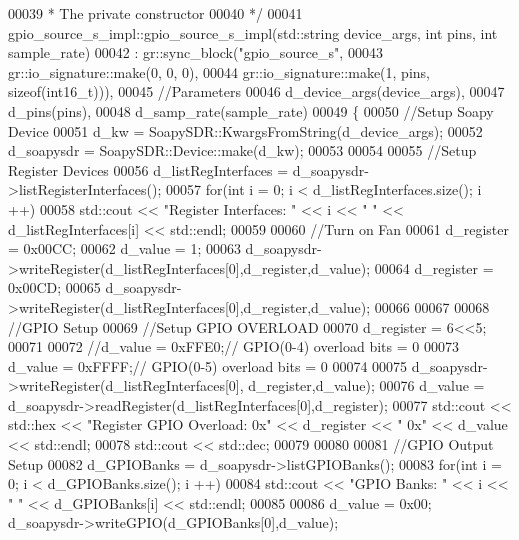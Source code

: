 \begin{DoxyCode}
00039 \textcolor{comment}{     * The private constructor}
00040 \textcolor{comment}{     */}
00041     gpio_source_s_impl::gpio_source_s_impl(std::string device\_args, \textcolor{keywordtype}{int} pins, \textcolor{keywordtype}{int} sample\_rate)
00042       : gr::sync\_block(\textcolor{stringliteral}{"gpio\_source\_s"},
00043               gr::io\_signature::make(0, 0, 0),
00044               gr::io\_signature::make(1, pins, sizeof(int16\_t))),
00045               \textcolor{comment}{//Parameters}
00046               d\_device\_args(device\_args),
00047               d\_pins(pins),
00048               d\_samp\_rate(sample\_rate)
00049     \{
00050     \textcolor{comment}{//Setup Soapy Device}
00051     d_kw = SoapySDR::KwargsFromString(d_device_args);
00052     d_soapysdr = SoapySDR::Device::make(d_kw);
00053 
00054 
00055     \textcolor{comment}{//Setup Register Devices}
00056     d_listRegInterfaces = d_soapysdr->listRegisterInterfaces();
00057     \textcolor{keywordflow}{for}(\textcolor{keywordtype}{int} i = 0; i < d_listRegInterfaces.size(); i ++)
00058       std::cout << \textcolor{stringliteral}{"Register Interfaces: "} << i << \textcolor{stringliteral}{" "} << d_listRegInterfaces[i] << std::endl;
00059 
00060     \textcolor{comment}{//Turn on Fan}
00061     d_register = 0x00CC;
00062     d_value = 1;
00063     d_soapysdr->writeRegister(d_listRegInterfaces[0],d_register,d_value);
00064     d_register = 0x00CD;
00065     d_soapysdr->writeRegister(d_listRegInterfaces[0],d_register,d_value);
00066 
00067 
00068     \textcolor{comment}{//GPIO Setup}
00069     \textcolor{comment}{//Setup GPIO OVERLOAD}
00070     d_register = 6<<5;
00071 
00072     \textcolor{comment}{//d\_value = 0xFFE0;// GPIO(0-4) overload bits = 0}
00073     d_value = 0xFFFF;\textcolor{comment}{// GPIO(0-5) overload bits = 0}
00074 
00075     d_soapysdr->writeRegister(d_listRegInterfaces[0], d_register,d_value);
00076     d_value = d_soapysdr->readRegister(d_listRegInterfaces[0],d_register);
00077     std::cout << std::hex << \textcolor{stringliteral}{"Register GPIO Overload: 0x"}  << d_register << \textcolor{stringliteral}{" 0x"}  <<  
      d_value << std::endl;
00078     std::cout << std::dec;
00079 
00080 
00081     \textcolor{comment}{//GPIO Output Setup}
00082     d_GPIOBanks = d_soapysdr->listGPIOBanks();
00083     \textcolor{keywordflow}{for}(\textcolor{keywordtype}{int} i = 0; i < d_GPIOBanks.size(); i ++)
00084       std::cout << \textcolor{stringliteral}{"GPIO Banks: "} << i << \textcolor{stringliteral}{" "} << d_GPIOBanks[i] << std::endl;
00085 
00086     d_value = 0x00; d_soapysdr->writeGPIO(d_GPIOBanks[0],d_value);

\end{DoxyCode}

